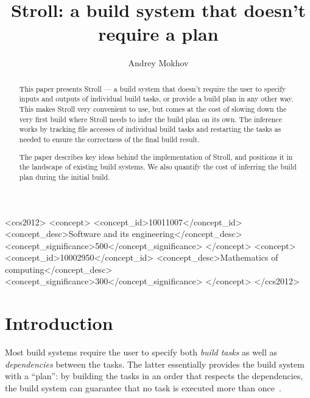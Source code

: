 \documentclass[sigconf]{acmart}
\begin{document}
\title{Stroll: a build system that doesn't require a plan}

\author{Andrey Mokhov}

\begin{abstract}
This paper presents Stroll --- a build system that doesn't require the user to
specify inputs and outputs of individual build tasks, or provide a build plan in
any other way. This makes Stroll very convenient to use, but comes at the cost
of slowing down the very first build where Stroll needs to infer the build plan
on its own. The inference works by tracking file accesses of individual build
tasks and restarting the tasks as needed to ensure the correctness of the final
build result.

The paper describes key ideas behind the implementation of Stroll, and positions
it in the landscape of existing build systems. We also quantify the cost of
inferring the build plan during the initial build.
\end{abstract}

\begin{CCSXML}
<ccs2012>
<concept>
<concept_id>10011007</concept_id>
 <concept_desc>Software and its engineering</concept_desc>
<concept_significance>500</concept_significance>
</concept>
<concept>
<concept_id>10002950</concept_id>
 <concept_desc>Mathematics of computing</concept_desc>
<concept_significance>300</concept_significance>
</concept>
</ccs2012>
\end{CCSXML}

\maketitle

\section{Introduction}
Most build systems require the user to specify both \emph{build tasks} as well
as \emph{dependencies} between the tasks. The latter essentially provides the
build system with a ``plan'': by building the tasks in an order that respects
the dependencies, the build system can guarantee that no task is executed more
than once~\cite{mokhov2020build}.
\end{document}
